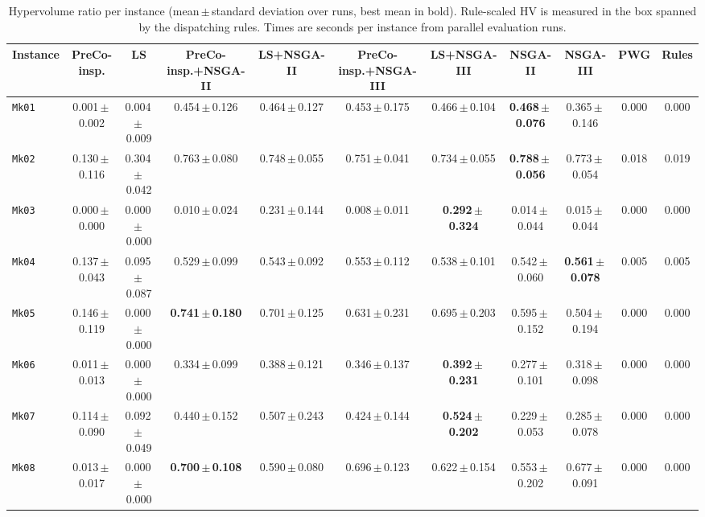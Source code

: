 \begin{table}[htbp]
\centering
\caption{Hypervolume ratio per instance (mean\,$\pm$\,standard deviation over runs, best mean in bold). Rule-scaled HV is measured in the box spanned by the dispatching rules. Times are seconds per instance from parallel evaluation runs.}
\label{tab:maininst}
\scriptsize
\setlength{\tabcolsep}{2.5pt}
\begin{tabular}{lcccccccccc}
\toprule
Instance & PreCo-insp. & LS & PreCo-insp.+NSGA-II & LS+NSGA-II & PreCo-insp.+NSGA-III & LS+NSGA-III & NSGA-II & NSGA-III & PWG & Rules \\
\midrule
\texttt{Mk01} & 0.001\,$\pm$\,0.002 & 0.004\,$\pm$\,0.009 & 0.454\,$\pm$\,0.126 & 0.464\,$\pm$\,0.127 & 0.453\,$\pm$\,0.175 & 0.466\,$\pm$\,0.104 & \textbf{0.468\,$\pm$\,0.076} & 0.365\,$\pm$\,0.146 & 0.000 & 0.000 \\
\texttt{Mk02} & 0.130\,$\pm$\,0.116 & 0.304\,$\pm$\,0.042 & 0.763\,$\pm$\,0.080 & 0.748\,$\pm$\,0.055 & 0.751\,$\pm$\,0.041 & 0.734\,$\pm$\,0.055 & \textbf{0.788\,$\pm$\,0.056} & 0.773\,$\pm$\,0.054 & 0.018 & 0.019 \\
\texttt{Mk03} & 0.000\,$\pm$\,0.000 & 0.000\,$\pm$\,0.000 & 0.010\,$\pm$\,0.024 & 0.231\,$\pm$\,0.144 & 0.008\,$\pm$\,0.011 & \textbf{0.292\,$\pm$\,0.324} & 0.014\,$\pm$\,0.044 & 0.015\,$\pm$\,0.044 & 0.000 & 0.000 \\
\texttt{Mk04} & 0.137\,$\pm$\,0.043 & 0.095\,$\pm$\,0.087 & 0.529\,$\pm$\,0.099 & 0.543\,$\pm$\,0.092 & 0.553\,$\pm$\,0.112 & 0.538\,$\pm$\,0.101 & 0.542\,$\pm$\,0.060 & \textbf{0.561\,$\pm$\,0.078} & 0.005 & 0.005 \\
\texttt{Mk05} & 0.146\,$\pm$\,0.119 & 0.000\,$\pm$\,0.000 & \textbf{0.741\,$\pm$\,0.180} & 0.701\,$\pm$\,0.125 & 0.631\,$\pm$\,0.231 & 0.695\,$\pm$\,0.203 & 0.595\,$\pm$\,0.152 & 0.504\,$\pm$\,0.194 & 0.000 & 0.000 \\
\texttt{Mk06} & 0.011\,$\pm$\,0.013 & 0.000\,$\pm$\,0.000 & 0.334\,$\pm$\,0.099 & 0.388\,$\pm$\,0.121 & 0.346\,$\pm$\,0.137 & \textbf{0.392\,$\pm$\,0.231} & 0.277\,$\pm$\,0.101 & 0.318\,$\pm$\,0.098 & 0.000 & 0.000 \\
\texttt{Mk07} & 0.114\,$\pm$\,0.090 & 0.092\,$\pm$\,0.049 & 0.440\,$\pm$\,0.152 & 0.507\,$\pm$\,0.243 & 0.424\,$\pm$\,0.144 & \textbf{0.524\,$\pm$\,0.202} & 0.229\,$\pm$\,0.053 & 0.285\,$\pm$\,0.078 & 0.000 & 0.000 \\
\texttt{Mk08} & 0.013\,$\pm$\,0.017 & 0.000\,$\pm$\,0.000 & \textbf{0.700\,$\pm$\,0.108} & 0.590\,$\pm$\,0.080 & 0.696\,$\pm$\,0.123 & 0.622\,$\pm$\,0.154 & 0.553\,$\pm$\,0.202 & 0.677\,$\pm$\,0.091 & 0.000 & 0.000 \\

\end{tabular}
\end{table}
